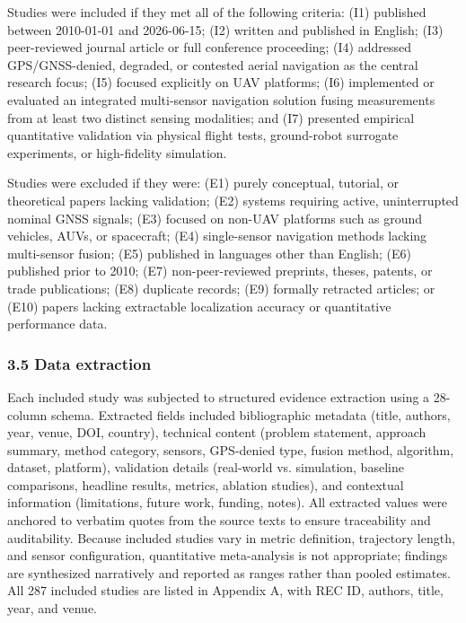 \documentclass[conference]{IEEEtran}
\begin{document}
Studies were included if they met all of the following criteria: (I1) published between 2010-01-01 and 2026-06-15; (I2) written and published in English; (I3) peer-reviewed journal article or full conference proceeding; (I4) addressed GPS/GNSS-denied, degraded, or contested aerial navigation as the central research focus; (I5) focused explicitly on UAV platforms; (I6) implemented or evaluated an integrated multi-sensor navigation solution fusing measurements from at least two distinct sensing modalities; and (I7) presented empirical quantitative validation via physical flight tests, ground-robot surrogate experiments, or high-fidelity simulation.


Studies were excluded if they were: (E1) purely conceptual, tutorial, or theoretical papers lacking validation; (E2) systems requiring active, uninterrupted nominal GNSS signals; (E3) focused on non-UAV platforms such as ground vehicles, AUVs, or spacecraft; (E4) single-sensor navigation methods lacking multi-sensor fusion; (E5) published in languages other than English; (E6) published prior to 2010; (E7) non-peer-reviewed preprints, theses, patents, or trade publications; (E8) duplicate records; (E9) formally retracted articles; or (E10) papers lacking extractable localization accuracy or quantitative performance data.


\subsubsection{3.5 Data extraction}


Each included study was subjected to structured evidence extraction using a 28-column schema. Extracted fields included bibliographic metadata (title, authors, year, venue, DOI, country), technical content (problem statement, approach summary, method category, sensors, GPS-denied type, fusion method, algorithm, dataset, platform), validation details (real-world vs. simulation, baseline comparisons, headline results, metrics, ablation studies), and contextual information (limitations, future work, funding, notes). All extracted values were anchored to verbatim quotes from the source texts to ensure traceability and auditability. Because included studies vary in metric definition, trajectory length, and sensor configuration, quantitative meta-analysis is not appropriate; findings are synthesized narratively and reported as ranges rather than pooled estimates. All 287 included studies are listed in Appendix A, with REC ID, authors, title, year, and venue.
\end{document}
